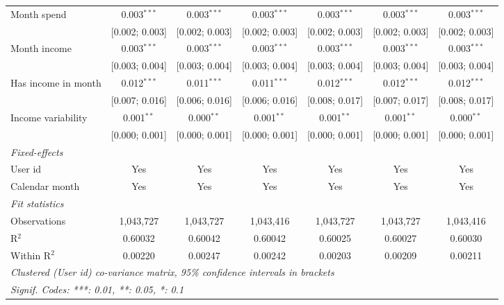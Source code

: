 \begin{table}[htbp]
\begin{threeparttable}[b]
\begin{tabular}{lcccccc}
         Month spend                & 0.003$^{***}$  & 0.003$^{***}$  & 0.003$^{***}$  & 0.003$^{***}$   & 0.003$^{***}$    & 0.003$^{***}$\\   
                                    & [0.002; 0.003] & [0.002; 0.003] & [0.002; 0.003] & [0.002; 0.003]  & [0.002; 0.003]   & [0.002; 0.003]\\   
         Month income               & 0.003$^{***}$  & 0.003$^{***}$  & 0.003$^{***}$  & 0.003$^{***}$   & 0.003$^{***}$    & 0.003$^{***}$\\   
                                    & [0.003; 0.004] & [0.003; 0.004] & [0.003; 0.004] & [0.003; 0.004]  & [0.003; 0.004]   & [0.003; 0.004]\\   
         Has income in month        & 0.012$^{***}$  & 0.011$^{***}$  & 0.011$^{***}$  & 0.012$^{***}$   & 0.012$^{***}$    & 0.012$^{***}$\\   
                                    & [0.007; 0.016] & [0.006; 0.016] & [0.006; 0.016] & [0.008; 0.017]  & [0.007; 0.017]   & [0.008; 0.017]\\   
         Income variability         & 0.001$^{**}$   & 0.000$^{**}$   & 0.001$^{**}$   & 0.001$^{**}$    & 0.001$^{**}$     & 0.000$^{**}$\\   
                                    & [0.000; 0.001] & [0.000; 0.001] & [0.000; 0.001] & [0.000; 0.001]  & [0.000; 0.001]   & [0.000; 0.001]\\   
         \midrule
         \emph{Fixed-effects}\\
         User id                    & Yes            & Yes            & Yes            & Yes             & Yes              & Yes\\  
         Calendar month             & Yes            & Yes            & Yes            & Yes             & Yes              & Yes\\  
         \midrule
         \emph{Fit statistics}\\
         Observations               & 1,043,727      & 1,043,727      & 1,043,416      & 1,043,727       & 1,043,727        & 1,043,416\\  
         R$^2$                      & 0.60032        & 0.60042        & 0.60042        & 0.60025         & 0.60027          & 0.60030\\  
         Within R$^2$               & 0.00220        & 0.00247        & 0.00242        & 0.00203         & 0.00209          & 0.00211\\  
         \midrule \midrule
         \multicolumn{7}{l}{\emph{Clustered (User id) co-variance matrix, 95\% confidence intervals in brackets}}\\
         \multicolumn{7}{l}{\emph{Signif. Codes: ***: 0.01, **: 0.05, *: 0.1}}\\
      \end{tabular}
   \end{threeparttable}
\end{table}



